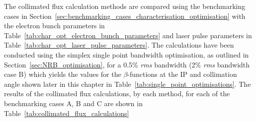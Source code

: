 \documentclass[../main.tex]{subfiles}
\begin{document}
The collimated flux calculation methods are compared using the benchmarking cases in Section~\ref{sec:benchmarking_cases_characterisation_optimisation} with the electron bunch parameters in Table~\ref{tab:char_opt_electron_bunch_parameters} and laser pulse parameters in Table~\ref{tab:char_opt_laser_pulse_parameters}. The calculations have been conducted using the simplex single point bandwidth optimisation, as outlined in Section~\ref{sec:NRB_optimisation}, for a 0.5\% \textit{rms} bandwidth (2\% \textit{rms} bandwidth case B) which yields the values for the $\beta$-functions at the IP and collimation angle shown later in this chapter in Table~\ref{tab:single_point_optimisations}. The results of the collimated flux calculations, by each method, for each of the benchmarking cases A, B and C are shown in Table~\ref{tab:collimated_flux_calculations}
\end{document}
